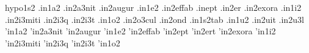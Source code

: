 {hypo1s2                                                                         
.in1a2                                                                          
.in2a3nit                                                                       
.in2augur                                                                       
.in1e2                                                                          
.in2effab                                                                       
.inept                                                                          
.in2er                                                                          
.in2exora                                                                       
.in1i2                                                                          
.in2i3miti                                                                      
.in2i3q                                                                         
.in2i3t                                                                         
.in1o2                                                                          
.in2o3cul                                                                       
.in2ond                                                                         
.in1s2tab                                                                       
.in1u2                                                                          
.in2uit                                                                         
.in2u3l                                                                         
'in1a2                                                                          
'in2a3nit                                                                       
'in2augur                                                                       
'in1e2                                                                          
'in2effab                                                                       
'in2ept                                                                         
'in2ert                                                                         
'in2exora                                                                       
'in1i2                                                                          
'in2i3miti                                                                      
'in2i3q                                                                         
'in2i3t                                                                         
'in1o2                                                                          
}
